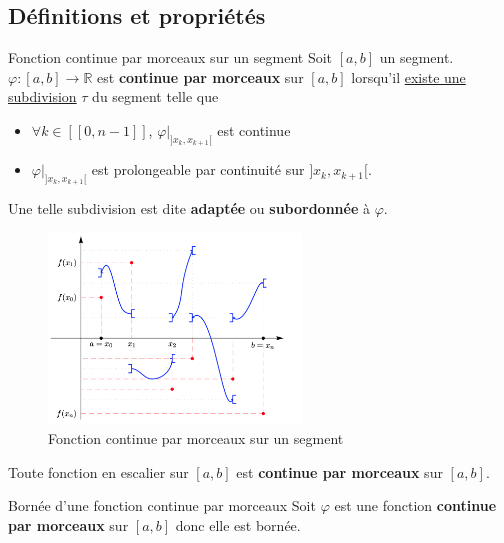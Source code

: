 \subsection{Définitions et propriétés} %
\label{sub:Définitions et propriétés}

\begin{Definition}[colbacktitle=red!75!black]{Fonction continue par morceaux sur un segment}{}
  Soit $[a,b]$ un segment. $\varphi : [a,b] \to \mathbb{R}$ est \textbf{continue par morceaux} sur $[a,b]$ lorsqu'il \underline{existe une subdivision} $\tau$ du segment telle que 
  \begin{itemize}

    \item $\forall k \in [\![0, n-1]\!]$, $\varphi| _{]x_k, x _{k+1}[}$ est continue
      
    \item $\varphi | _{]x_k, x _{k+1}[}$ est prolongeable par continuité sur $]x_k, x _{k+1}[$. 

  \end{itemize}
  Une telle subdivision est dite \textbf{adaptée} ou \textbf{subordonnée} à $\varphi$.

  \begin{figure}[H] %
    \centering
    \includegraphics[width=0.6\textwidth]{./assets/Fonction continue par morceaux sur un segment.png}
    \caption{Fonction continue par morceaux sur un segment}
    \label{fig:Fonction continue par morceaux sur un segment}
  \end{figure}

  

\end{Definition}

Toute fonction en escalier sur $[a,b]$ est \textbf{continue par morceaux} sur $[a,b]$.

\begin{Prop}{Bornée d'une fonction continue par morceaux}{}
  Soit $\varphi$ est une fonction \textbf{continue par morceaux} sur $[a,b]$ donc elle est bornée.
\end{Prop}


